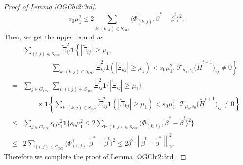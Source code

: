 \documentclass[12pt]{article}
\newtheorem{proof}{Proof}
\begin{document}
\begin{appendix}
\begin{proof}[Proof of Lemma \ref{OGChi2:3rd}]
    $$s_0 \mu_1^2 \le  2\sum_{k: (k,j) \in S_{OG}} \langle {\Phi}_{(k,j)}^\top, \tilde \beta^* -\tilde \beta^t \rangle^2. $$
    Then, we get the upper bound as
    \begin{equation}\label{GroupXifailHsuccess}
        \begin{aligned}
        &  \sum_{(i,j) \in S_{OG}} \tilde \Xi_{ij}^2\mathbf1\left\{|\tilde \Xi_{ij}|\ge \mu_1, \right. \\
& \qquad\qquad \left.~ \sum_{k: (k,j) \in S_{OG}} \tilde \Xi_{kj}^2 \mathbf1 (|\tilde \Xi_{kj}|\ge \mu_1)< s_0\mu_1^2,~  \mathcal T_{\mu_{2},s_0} \big(\tilde H^{t+1}\big)_{ij}\ne 0 \right\} \\
=&\sum_{ j \in G_{OG}}~ \sum_{i:(i,j) \in S_{OG}} \tilde \Xi_{ij}^2 \mathbf1\Big\{|\tilde \Xi_{ij}|\ge \mu_1\Big\}\\
 &\qquad\times  \mathbf1\left\{\sum_{k: (k,j) \in S_{OG}} \tilde \Xi_{kj}^2 \mathbf1 (|\tilde \Xi_{kj}|\ge \mu_1)< s_0\mu_1^2,~  \mathcal T_{\mu_{2},s_0} \big(\tilde H^{t+1}\big)_{ij}\ne 0 \right\} \\
\le & \sum_{j\in G_{OG}} s_0\mu_1^2 \mathbf1 \Big\{s_0 \mu_1^2 \le  2\sum_{k: (k,j) \in S_{OG}} \langle {\Phi}_{(k,j)}^\top, \tilde \beta^* -\tilde \beta^t \rangle^2 \Big\} \\
        \le & 2 \sum_{(i,j) \in S_{OG}} \langle {\Phi}_{(i,j)}^\top, \tilde \beta^*-\tilde\beta^t \rangle^2  
        \le  2 \delta^2 \left\| \tilde \beta^t - \tilde \beta^* \right\|_2^2 .
        \end{aligned}
    \end{equation}
    Therefore we complete the proof of Lemma \ref{OGChi2:3rd}.
\end{proof}



\end{appendix}
\end{document}
